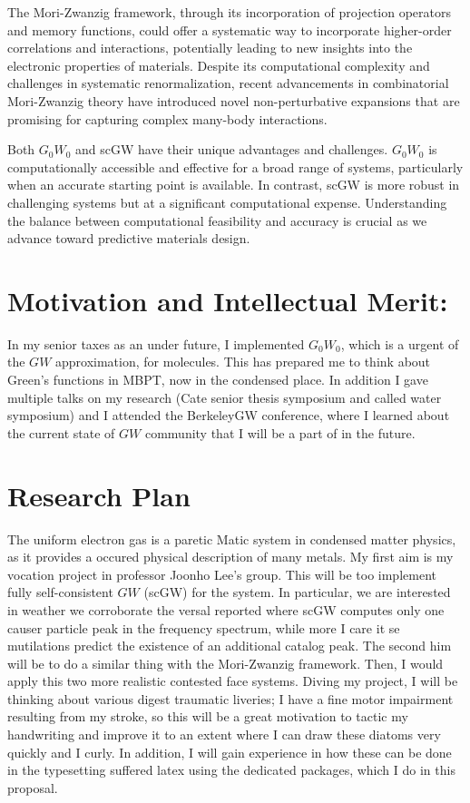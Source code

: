 \documentclass[11pt]{article} %
\begin{document}
The Mori-Zwanzig framework, through its incorporation of projection operators and memory functions, could offer a systematic way to incorporate higher-order correlations and interactions, potentially leading to new insights into the electronic properties of materials. Despite its computational complexity and challenges in systematic renormalization, recent advancements in combinatorial Mori-Zwanzig theory have introduced novel non-perturbative expansions that are promising for capturing complex many-body interactions.

Both \( G_0W_0 \) and scGW have their unique advantages and challenges. \( G_0W_0 \) is computationally accessible and effective for a broad range of systems, particularly when an accurate starting point is available. In contrast, scGW is more robust in challenging systems but at a significant computational expense. Understanding the balance between computational feasibility and accuracy is crucial as we advance toward predictive materials design.




\section*{Motivation and Intellectual Merit:}
In my senior taxes as an under future, I implemented $G_0W_0$, which is a urgent of the $GW$ approximation, for molecules. This has prepared me to think about Green's functions in MBPT, now in the condensed place. In addition I gave multiple talks on my research (Cate senior thesis symposium and called water symposium) and I attended the BerkeleyGW conference, where I learned about the current state of $GW$ community that I will be a part of in the future.

\section*{Research Plan}
The uniform electron gas is a paretic Matic system in condensed matter physics, as it provides a occured physical description of many metals. My first aim is my vocation project in professor Joonho Lee's group. This will be too implement fully self-consistent $GW$ (scGW) for the system. In particular, we are interested in weather we corroborate the versal reported where scGW computes only one causer particle peak in the frequency spectrum, while more I care it se mutilations predict the existence of an additional catalog peak. The second him will be to do a similar thing with the Mori-Zwanzig framework. Then, I would apply this two more realistic contested face systems. Diving my project, I will be thinking about various digest traumatic liveries; I have a fine motor impairment resulting from my stroke, so this will be a great motivation to tactic my handwriting and improve it to an extent where I can draw these diatoms very quickly and I curly. In addition, I will gain experience in how these can be done in the typesetting suffered latex using the dedicated packages, which I do in this proposal.
\end{document}

